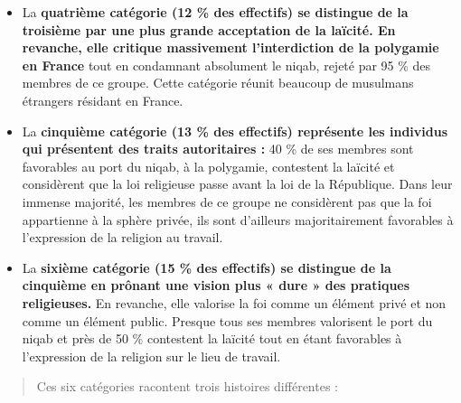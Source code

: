 \begin{itemize}
\item
  La \textbf{quatrième catégorie (12 \% des effectifs) se distingue de
  la troisième par une plus grande acceptation de la laïcité. En
  revanche, elle critique massivement l'interdiction de la polygamie en
  France} tout en condamnant absolument le niqab, rejeté par 95 \% des
  membres de ce groupe. Cette catégorie réunit beaucoup de musulmans
  étrangers résidant en France.
\item
  La \textbf{cinquième catégorie (13 \% des effectifs) représente les
  individus qui présentent des traits autoritaires :} 40 \% de ses
  membres sont favorables au port du niqab, à la polygamie, contestent
  la laïcité et considèrent que la loi religieuse passe avant la loi de
  la République. Dans leur immense majorité, les membres de ce groupe ne
  considèrent pas que la foi appartienne à la sphère privée, ils sont
  d'ailleurs majoritairement favorables à l'expression de la religion au
  travail.
\item
  La \textbf{sixième catégorie (15 \% des effectifs) se distingue de la
  cinquième en prônant une vision plus « dure » des pratiques
  religieuses.} En revanche, elle valorise la foi comme un élément privé
  et non comme un élément public. Presque tous ses membres valorisent le
  port du niqab et près de 50 \% contestent la laïcité tout en étant
  favorables à l'expression de la religion sur le lieu de travail.
\end{itemize}

\begin{quote}
Ces six catégories racontent trois histoires différentes :
\end{quote}

